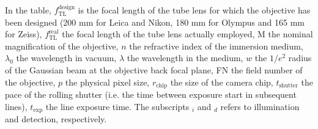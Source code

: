 \documentclass[12pt]{spieman}  %
\begin{document}
\begin{spacing}{2}
In the table, $f_{\text{TL}}^{\text{design}}$ is the focal length of the tube lens for which the objective has been designed (200 mm for Leica and Nikon, 180 mm for Olympus and 165 mm for Zeiss), $f_{\text{TL}}^{\text{real}}$ the focal length of the tube lens actually employed, $\text{M}$ the nominal magnification of the objective, $n$ the refractive index of the immersion medium, $\lambda_0$ the wavelength in vacuum, $\lambda$ the wavelength in the medium, $w$ the $1/e^2$ radius of the Gaussian beam at the objective back focal plane, FN the field number of the objective, $p$ the physical pixel size, $r_{\text{chip}}$ the size of the camera chip, $t_{\text{shutter}}$ the pace of the rolling shutter (i.e. the time between exposure start in subsequent lines), $ t_{\text{exp}}$ the line exposure time. The subscripts $_i$ and $_d$ refers to illumination and detection, respectively.


\end{spacing}
\end{document}
